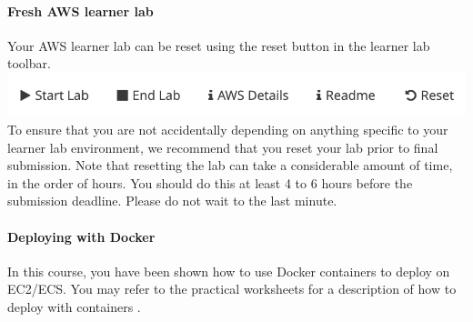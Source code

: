 \documentclass{csse4400}
\begin{document}
\paragraph{Fresh AWS learner lab}
Your AWS learner lab can be reset using the reset button in the learner lab toolbar.
\includegraphics[width=\textwidth]{images/reset-button.png}
To ensure that you are not accidentally depending on anything specific to your learner lab environment,
we recommend that you reset your lab prior to final submission.
Note that resetting the lab can take a considerable amount of time, in the order of hours.
You should do this at least 4 to 6 hours before the submission deadline.
Please do not wait to the last minute.

\paragraph{Deploying with Docker}
In this course,
you have been shown how to use Docker containers to deploy on EC2/ECS.
You may refer to the practical worksheets for a description of how to deploy with containers \cite{prac-week5}.




\end{document}
